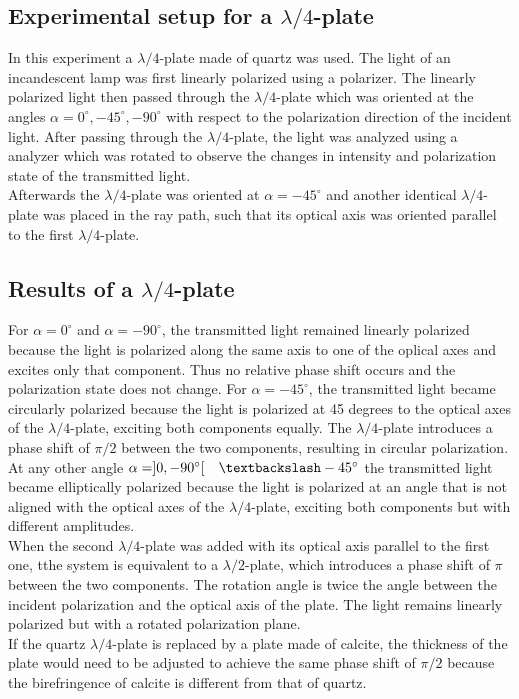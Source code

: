     \subsection{Experimental setup for a $\lambda/4$-plate}
    In this experiment a $\lambda/4$-plate made of quartz was used. The light of an incandescent lamp was first linearly polarized using a polarizer.
    The linearly polarized light then passed through the $\lambda/4$-plate which was oriented at the angles $\alpha = 0^\circ, -45^\circ, -90^\circ$ 
    with respect to the polarization direction of the incident light. After passing through the $\lambda/4$-plate, the light was analyzed using a
    analyzer which was rotated to observe the changes in intensity and polarization state of the transmitted light. \\
    Afterwards the $\lambda/4$-plate was oriented at $\alpha = -45^\circ$ and another identical $\lambda/4$-plate was placed in the ray path, such that
    its optical axis was oriented parallel to the first $\lambda/4$-plate.

    \subsection{Results of a $\lambda/4$-plate}

    For $\alpha = 0^\circ$ and $\alpha = -90^\circ$, the transmitted light remained linearly polarized because the light is polarized along the same axis to
    one of the oplical axes and excites only that component. Thus no relative phase shift occurs and the polarization state does not change.
    For $\alpha = -45^\circ$, the transmitted light became circularly polarized because the light is polarized at 45 degrees to the optical axes of
    the $\lambda/4$-plate, exciting both components equally. The $\lambda/4$-plate introduces a phase shift of $\pi/2$ between the two components, resulting
    in circular polarization. At any other angle $\alpha  = ]0, -90^\circ[ \quad \textbackslash -45^\circ$ the transmitted light became elliptically polarized
    because the light is polarized at an angle that is not aligned with the optical axes of the $\lambda/4$-plate, exciting both components but with different
    amplitudes. \\
    When the second $\lambda/4$-plate was added with its optical axis parallel to the first one, tthe system is equivalent to a $\lambda/2$-plate,
    which introduces a phase shift of $\pi$ between the two components. The rotation angle is twice the angle between the incident polarization and the optical
    axis of the plate. The light remains linearly polarized but with a rotated polarization plane. \\
    If the quartz $\lambda/4$-plate is replaced by a plate made of calcite, the thickness of the plate would need to be adjusted to achieve the same phase
    shift of $\pi/2$ because the birefringence of calcite is different from that of quartz.